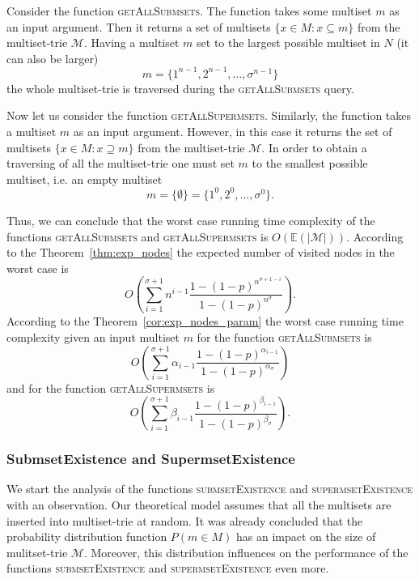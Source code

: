 \documentclass[10pt,letterpaper]{article}
\begin{document}
Consider the function \textsc{getAllSubmsets}. The function takes some multiset 
$m$ as an input argument. Then it returns a set of multisets $\{x\in M : x\subseteq m \}$ 
from the multiset-trie $\mathcal{M}$. Having a multiset $m$ set to the largest 
possible multiset in $N$ (it can also be larger) 
\[
m = \{ 1^{n-1},2^{n-1},\ldots, \sigma^{n-1} \}
\]
the whole multiset-trie is traversed during the \textsc{getAllSubmsets} query.

Now let us consider the function \textsc{getAllSupermsets}. Similarly, the function 
takes a multiset $m$ as an input argument. However, in this case it returns the 
set of multisets $\{ x\in M : x\supseteq m \}$ from the multiset-trie 
$\mathcal{M}.$ In order to obtain a traversing of all the multiset-trie one must set 
$m$ to the smallest possible multiset, i.e. an empty multiset
\begin{equation*}
m = \{ \emptyset \} = \{ 1^0,2^0, \ldots, \sigma^0 \}.
\end{equation*}

Thus, we can conclude that the worst case running time complexity of the 
functions \textsc{getAllSubmsets} and \textsc{getAllSupermsets} is $O(\mathbb{E}( |\mathcal{M}| )).$ 
According to the Theorem~\ref{thm:exp_nodes} the expected number of visited 
nodes in the worst case is 
\begin{equation*}
O(\sum_{i=1}^{\sigma+1} n^{i-1} \frac{1-(1-p)^{n^{\sigma +1 -i}}}{1-(1-p)^{n^{\sigma}}}).
\end{equation*}
According to the Theorem~\ref{cor:exp_nodes_param} the worst case running 
time complexity given an input multiset $m$ for the function \textsc{getAllSubmsets} is 
\begin{equation*}
O(\sum_{i=1}^{\sigma + 1} \alpha_{i-1} \frac{1-(1-p)^{\alpha_{i-1}}}{1-(1-p)^{\alpha_{\sigma}}})
\end{equation*}
and for the function \textsc{getAllSupermsets} is 
\begin{equation*}
O(\sum_{i=1}^{\sigma + 1} \beta_{i-1} \frac{1-(1-p)^{\beta_{i-1}}}{1-(1-p)^{\beta_{\sigma}}}).
\end{equation*}


\subsubsection{SubmsetExistence and SupermsetExistence}\label{ss:exists}
We start the analysis of the functions \textsc{submsetExistence} and 
\textsc{supermsetExistence} with an observation. Our theoretical model assumes 
that all the multisets are inserted into multiset-trie at random. It was already concluded 
that the probability distribution function $P(m\in M)$ has an impact on the size of 
mulitset-trie $\mathcal{M}.$ Moreover, this distribution influences on the performance 
of the functions \textsc{submsetExistence} and \textsc{supermsetExistence} even more. 
\end{document}
